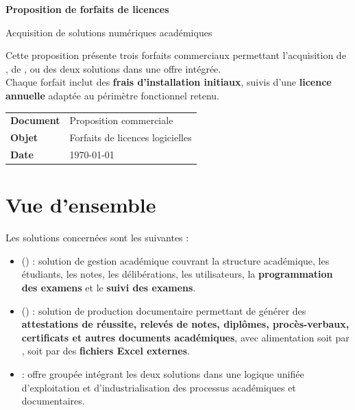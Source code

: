 \documentclass[12pt,a4paper]{article}
\newcommand{\FeatureListStart}{\begin{itemize}[leftmargin=1.2cm,itemsep=0.3em]}
\newcommand{\FeatureListEnd}{\end{itemize}}
\begin{document}
\begin{titlepage}
    \centering
    \vspace*{2cm}
    {\Huge\bfseries Proposition de forfaits de licences\par}
    \vspace{0.6cm}
    {\Large Acquisition de solutions numériques académiques\par}
    \vspace{1.5cm}

    \begin{tcolorbox}[colback=SoftBlue,colframe=PrimaryBlue,width=0.92\textwidth]
        \centering
        Cette proposition présente trois forfaits commerciaux permettant l'acquisition de \textbf{\AcademicSoftwareName}, de \textbf{\DocumentSoftwareName}, ou des deux solutions dans une offre intégrée.\\[0.4em]
        Chaque forfait inclut des \textbf{frais d'installation initiaux}, suivis d'une \textbf{licence annuelle} adaptée au périmètre fonctionnel retenu.
    \end{tcolorbox}

    \vfill

    \begin{tabular}{ll}
        \textbf{Document} & Proposition commerciale \\
        \textbf{Objet} & Forfaits de licences logicielles \\
        \textbf{Date} & \today \\
    \end{tabular}

    \vfill
\end{titlepage}

\section{Vue d'ensemble}

Les solutions concernées sont les suivantes :
\FeatureListStart
    \item \textbf{\AcademicSoftwareName} (\AcademicSoftwareFullName) : solution de gestion académique couvrant la structure académique, les étudiants, les notes, les délibérations, les utilisateurs, la \textbf{programmation des examens} et le \textbf{suivi des examens}.
    \item \textbf{\DocumentSoftwareName} (\DocumentSoftwareFullName) : solution de production documentaire permettant de générer des \textbf{attestations de réussite, relevés de notes, diplômes, procès-verbaux, certificats et autres documents académiques}, avec alimentation soit par \AcademicSoftwareName, soit par des \textbf{fichiers Excel externes}.
    \item \textbf{\BundleSoftwareName} : offre groupée intégrant les deux solutions dans une logique unifiée d'exploitation et d'industrialisation des processus académiques et documentaires.
\FeatureListEnd
\end{document}
